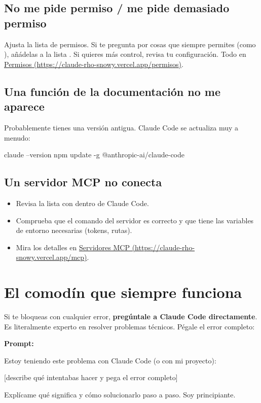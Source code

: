 \documentclass[11pt,a4paper]{report}
\DeclareRobustCommand{\texttt}[1]{{\ttfamily\seqsplit{#1}}}
\begin{document}
\subsection{No me pide permiso / me pide demasiado permiso}

Ajusta la lista de permisos. Si te pregunta por cosas que siempre permites (como \texttt{npm run}), añádelas a la lista \texttt{allow}. Si quieres más control, revisa tu configuración. Todo en \href{https://claude-rho-snowy.vercel.app/permisos}{Permisos (\url{https://claude-rho-snowy.vercel.app/permisos})}.

\subsection{Una función de la documentación no me aparece}

Probablemente tienes una versión antigua. Claude Code se actualiza muy a menudo:

\begin{codebox}
claude --version
npm update -g @anthropic-ai/claude-code
\end{codebox}

\subsection{Un servidor MCP no conecta}

\begin{itemize}
\item Revisa la lista con \texttt{/mcp} dentro de Claude Code.
\item Comprueba que el comando del servidor es correcto y que tiene las variables de entorno necesarias (tokens, rutas).
\item Mira los detalles en \href{https://claude-rho-snowy.vercel.app/mcp}{Servidores MCP (\url{https://claude-rho-snowy.vercel.app/mcp})}.
\end{itemize}

\section{El comodín que siempre funciona}

Si te bloqueas con cualquier error, \textbf{pregúntale a Claude Code directamente}. Es literalmente experto en resolver problemas técnicos. Pégale el error completo:

\noindent\textbf{Prompt: }
\begin{codebox}
Estoy teniendo este problema con Claude Code (o con mi proyecto):

[describe qué intentabas hacer y pega el error completo]

Explícame qué significa y cómo solucionarlo paso a paso. Soy principiante.
\end{codebox}
\end{document}
